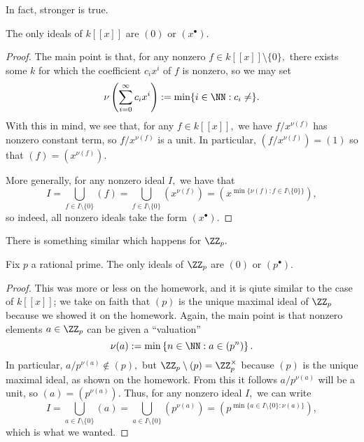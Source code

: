 \documentclass[../notes.tex]{subfiles}
\begin{document}
In fact, stronger is true.
\begin{proposition}
	The only ideals of $k[[x]]$ are $(0)$ or $\left(x^\bullet\right).$
\end{proposition}
\begin{proof}
	The main point is that, for any nonzero $f\in k[[x]]\setminus\{0\},$ there exists some $k$ for which the coefficient $c_ix^i$ of $f$ is nonzero, so we may set
	\[\nu\left(\sum_{i=0}^\infty c_ix^i\right):=\min\{i\in\NN:c_i\ne\}.\]
	With this in mind, we see that, for any $f\in k[[x]],$ we have $f/x^{\nu(f)}$ has nonzero constant term, so $f/x^{\nu(f)}$ is a unit. In particular, $\left(f/x^{\nu(f)}\right)=(1)$ so that $(f)=\left(x^{\nu(f)}\right).$

	More generally, for any nonzero ideal $I,$ we have that
	\[I=\bigcup_{f\in I\setminus\{0\}}(f)=\bigcup_{f\in I\setminus\{0\}}\left(x^{\nu(f)}\right)=\left(x^{\min\{\nu(f):f\in I\setminus\{0\}\}}\right),\]
	so indeed, all nonzero ideals take the form $\left(x^\bullet\right).$
\end{proof}
There is something similar which happens for $\ZZ_p.$
\begin{proposition}
	Fix $p$ a rational prime. The only ideals of $\ZZ_p$ are $(0)$ or $\left(p^\bullet\right).$
\end{proposition}
\begin{proof}
	This was more or less on the homework, and it is qiute similar to the case of $k[[x]]$; we take on faith that $(p)$ is the unique maximal ideal of $\ZZ_p$ because we showed it on the homework. Again, the main point is that nonzero elements $a\in\ZZ_p$ can be given a ``valuation''
	\[\nu(a):=\min\left\{n\in\NN:a\in\left(p^n\right)\right\}.\]
	In particular, $a/p^{\nu(a)}\notin(p),$ but $\ZZ_p\setminus(p)=\ZZ_p^\times$ because $(p)$ is the unique maximal ideal, as shown on the homework. From this it follows $a/p^{\nu(a)}$ will be a unit, so $(a)=\left(p^{\nu(a)}\right).$ Thus, for any nonzero ideal $I,$ we can write
	\[I=\bigcup_{a\in I\setminus\{0\}}(a)=\bigcup_{a\in I\setminus\{0\}}\left(p^{\nu(a)}\right)=\left(p^{\min\{a\in I\setminus\{0\}:\nu(a)\}}\right),\]
	which is what we wanted.
\end{proof}
\end{document}

